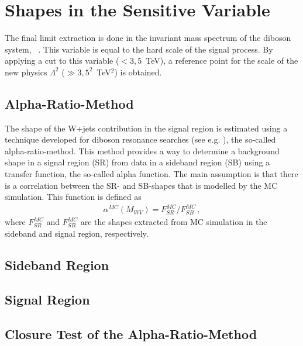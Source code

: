 \section{Shapes in the Sensitive Variable}
The final limit extraction is done in the invariant mass spectrum of the diboson system, \MWV \ . This variable is equal to the hard scale of the signal process. By applying a cut to this variable ($<3,5$\, TeV), a reference point for the scale of the new physics $\Lambda^2$ ($\gg 3,5^2$\, TeV$^2$) is obtained.

\subsection{Alpha-Ratio-Method}
\label{sec:AlphaRatioMethod}
The shape of the W+jets contribution in the signal region is estimated using a technique developed for diboson resonance searches (see e.g. \cite{resonancepas}), the so-called alpha-ratio-method. This method provides a way to determine a background shape in a signal region (SR) from data in a sideband region (SB) using a transfer function, the so-called alpha function. The main assumption is that there is a correlation between the SR- and SB-shapes that is modelled by the MC simulation.  This function is defined as
\begin{align}
\alpha^{MC}(M_{WV})=F_{SR}^{MC}/F_{SB}^{MC} \, ,
\end{align}
where $F_{SR}^{MC}$ and $F_{SB}^{MC}$ are the shapes extracted from MC simulation in the sideband and signal region, respectively.

\subsection{Sideband Region}

\subsection{Signal Region}

\subsection{Closure Test of the Alpha-Ratio-Method}
